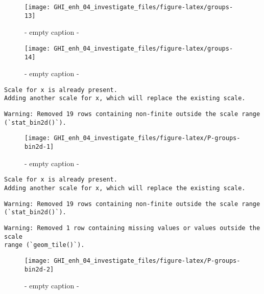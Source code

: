 \documentclass[
  10pt,
  a4paper,oneside]{article}
\begin{document}
\begin{figure}[H]

{\centering \texttt{[image: GHI\_enh\_04\_investigate\_files/figure-latex/groups-13]} 

}

\caption{ - empty caption - }\label{fig:groups-13}
\end{figure}
\begin{figure}[H]

{\centering \texttt{[image: GHI\_enh\_04\_investigate\_files/figure-latex/groups-14]} 

}

\caption{ - empty caption - }\label{fig:groups-14}
\end{figure}

\begin{verbatim}
Scale for x is already present.
Adding another scale for x, which will replace the existing scale.
\end{verbatim}

\begin{verbatim}
Warning: Removed 19 rows containing non-finite outside the scale range
(`stat_bin2d()`).
\end{verbatim}

\begin{figure}[H]

{\centering \texttt{[image: GHI\_enh\_04\_investigate\_files/figure-latex/P-groups-bin2d-1]} 

}

\caption{ - empty caption - }\label{fig:P-groups-bin2d-1}
\end{figure}

\begin{verbatim}
Scale for x is already present.
Adding another scale for x, which will replace the existing scale.
\end{verbatim}

\begin{verbatim}
Warning: Removed 19 rows containing non-finite outside the scale range
(`stat_bin2d()`).
\end{verbatim}

\begin{verbatim}
Warning: Removed 1 row containing missing values or values outside the scale
range (`geom_tile()`).
\end{verbatim}

\begin{figure}[H]

{\centering \texttt{[image: GHI\_enh\_04\_investigate\_files/figure-latex/P-groups-bin2d-2]} 

}

\caption{ - empty caption - }\label{fig:P-groups-bin2d-2}
\end{figure}
\end{document}
